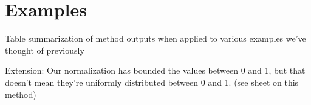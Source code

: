\section{Examples}
\label{sec:gc:examples}

Table summarization of method outputs when applied to various examples we've 
thought of previously

Extension:
Our normalization has bounded the values between 0 and 1, but that doesn't mean 
they're uniformly distributed between 0 and 1. 
(see sheet on this method)